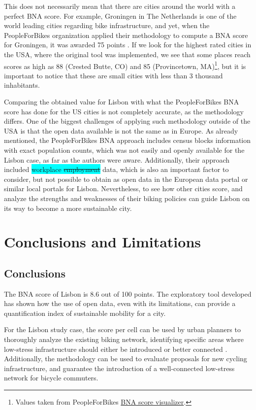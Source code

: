 \documentclass[information,article,submit,moreauthors,Latex,dvi2pdf,10pt,a4paper]{Definitions/mdpi}
\begin{document}
\bigskip

This does not necessarily mean that there are cities around the world with a perfect BNA score. For example, Groningen in The Netherlands is one of the world leading cities regarding bike infrastructure, and yet, when the PeopleForBikes organization applied their methodology to compute a BNA score for Groningen, it was awarded 75 points \cite{Boldry2017}. If we look for the highest rated cities in the USA, where the original tool was implemented, we see that some places reach scores as high as 88 (Crested Butte, CO) and 85 (Provincetown, MA)\footnote{Values taken from PeopleForBikes \protect\href{http://bna.peopleforbikes.org/}{BNA score visualizer}.}, but it is important to notice that these are small cities with less than 3 thousand inhabitants.

Comparing the obtained value for Lisbon with what the PeopleForBikes BNA score has done for the US cities is not completely accurate, as the methodology differs. One of the biggest challenges of applying such methodology outside of the USA is that the open data available is not the same as in Europe. As already mentioned, the PeopleForBikes BNA approach includes census blocks information with exact population counts, which was not easily and openly available for the Lisbon case, as far as the authors were aware. Additionally, their approach included \colorbox{cyan}{workplace \sout{employment}} data, which is also an important factor to consider, but not possible to obtain as open data in the European data portal or similar local portals for Lisbon. Nevertheless, to see how other cities score, and analyze the strengths and weaknesses of their biking policies can guide Lisbon on its way to become a more sustainable city. 

\section{Conclusions and Limitations} \label{conclusion}

\subsection{Conclusions}
The BNA score of Lisbon is 8.6 out of 100 points. The exploratory tool developed has shown how the use of open data, even with its limitations, can provide a quantification index of sustainable mobility for a city. 
\begin{mycolorbox}[colback=orange]
For the Lisbon study case, the score per cell can be used by urban planners to thoroughly analyze the existing biking network, identifying specific areas where low-stress infrastructure should either be introduced or better connected . Additionally, the methodology can be used to evaluate proposals for new cycling infrastructure, and guarantee the introduction of a well-connected low-stress network for bicycle commuters.
\end{mycolorbox}
\end{document}

